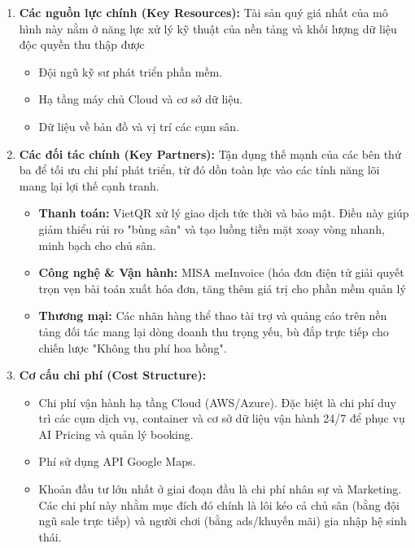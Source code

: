 \begin{enumerate}
    \item \textbf{Các nguồn lực chính (Key Resources):} Tài sản quý giá nhất của mô hình này nằm ở năng lực xử lý kỹ thuật của nền tảng và khối lượng dữ liệu độc quyền thu thập được
    \begin{itemize}
        \item Đội ngũ kỹ sư phát triển phần mềm.
        \item Hạ tầng máy chủ Cloud và cơ sở dữ liệu.
        \item Dữ liệu về bản đồ và vị trí các cụm sân.
    \end{itemize}

    \item \textbf{Các đối tác chính (Key Partners):} Tận dụng thế mạnh của các bên thứ ba để tối ưu chi phí phát triển, từ đó dồn toàn lực vào các tính năng lõi mang lại lợi thế cạnh tranh.
    \begin{itemize}
        \item \textbf{Thanh toán:} VietQR xử lý giao dịch tức thời và bảo mật. Điều này giúp giảm thiểu rủi ro "bùng sân" và tạo luồng tiền mặt xoay vòng nhanh, minh bạch cho chủ sân.
        \item \textbf{Công nghệ \& Vận hành:} MISA meInvoice (hóa đơn điện tử giải quyết trọn vẹn bài toán xuất hóa đơn, tăng thêm giá trị cho phần mềm quản lý
        \item \textbf{Thương mại:} Các nhãn hàng thể thao tài trợ và quảng cáo trên nền tảng đối tác mang lại dòng doanh thu trọng yếu, bù đắp trực tiếp cho chiến lược "Không thu phí hoa hồng".
    \end{itemize}

    \item \textbf{Cơ cấu chi phí (Cost Structure):}
    \begin{itemize}
        \item Chi phí vận hành hạ tầng Cloud (AWS/Azure). Đặc biệt là chi phí duy trì các cụm dịch vụ, container và cơ sở dữ liệu vận hành 24/7 để phục vụ AI Pricing và quản lý booking.
        \item Phí sử dụng API Google Maps.
        \item  Khoản đầu tư lớn nhất ở giai đoạn đầu là chi phí nhân sự và Marketing. Các chi phí này nhằm mục đích đó chính là lôi kéo cả chủ sân (bằng đội ngũ sale trực tiếp) và người chơi (bằng ads/khuyến mãi) gia nhập hệ sinh thái.
    \end{itemize}
\end{enumerate}
